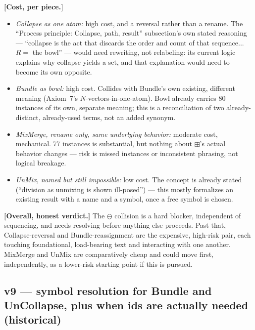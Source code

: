 \documentclass[11pt]{article}
\begin{document}
\textbf{[Cost, per piece.]}
\begin{itemize}
\item \emph{Collapse as one atom:} high cost, and a reversal rather
      than a rename. The ``Process principle: Collapse, path,
      result'' subsection's own stated reasoning --- ``collapse is
      the act that discards the order and count of that sequence...
      $R=$ the bowl'' --- would need rewriting, not relabeling: its
      current logic explains why collapse yields a set, and that
      explanation would need to become its own opposite.
\item \emph{Bundle as bowl:} high cost. Collides with Bundle's own
      existing, different meaning (Axiom~7's $N$-vectors-in-one-atom).
      Bowl already carries 80 instances of its own, separate meaning;
      this is a reconciliation of two already-distinct, already-used
      terms, not an added synonym.
\item \emph{MixMerge, rename only, same underlying behavior:}
      moderate cost, mechanical. 77 instances is substantial, but
      nothing about $\boxplus$'s actual behavior changes --- risk is
      missed instances or inconsistent phrasing, not logical
      breakage.
\item \emph{UnMix, named but still impossible:} low cost. The concept
      is already stated (``division as unmixing is shown ill-posed'')
      --- this mostly formalizes an existing result with a name and a
      symbol, once a free symbol is chosen.
\end{itemize}

\textbf{[Overall, honest verdict.]} The $\ominus$ collision is a hard
blocker, independent of sequencing, and needs resolving before
anything else proceeds. Past that, Collapse-reversal and
Bundle-reassignment are the expensive, high-risk pair, each touching
foundational, load-bearing text and interacting with one another.
MixMerge and UnMix are comparatively cheap and could move first,
independently, as a lower-risk starting point if this is pursued.

\subsection*{v9 --- symbol resolution for Bundle and UnCollapse, plus
when ids are actually needed (historical)}
\end{document}
